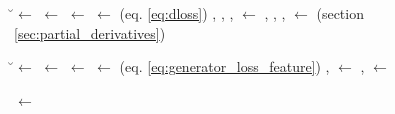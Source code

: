 \begin{algorithm}[H]
{{            \u $\leftarrow$ \Sample{\U} \;
            \fake $\leftarrow$ \Generate{\u} \;
            \real $\leftarrow$ \URMtrain[\u] \;
            \Dloss $\leftarrow$ \Compute{\real, \fake} (eq. \ref{eq:dloss}) \;
            \pBE, \pBD, \pTE, \pTD $\leftarrow$ \Compute{\Dloss, \be, \bd, \thetae, \thetad} \;
            \be, \bd, \thetae, \thetad $\leftarrow$ \Update{\be, \bd, \thetae, \thetad, \pBE, \pBD, \pTE, \pTD, \Dlr} (section \ref{sec:partial_derivatives})\;
            
            \BlankLine\BlankLine
            
            \u $\leftarrow$ \Sample{\U} \;
            \fake $\leftarrow$ \Generate{\u} \;
            \real $\leftarrow$ \URMtrain[\u] \;
            \Gloss $\leftarrow$ \Compute{\real, \fake} (eq. \ref{eq:generator_loss_feature}) \;
            \pWzero, \pWone $\leftarrow$ \Compute{\Gloss, \wzero, \wone} \;
            \wzero, \wone $\leftarrow$ \Update{\wzero, \wone, \pWzero, \pWone, \Glr} \;
        }
    
        \BlankLine\BlankLine
        
        \Perf $\leftarrow$ \Evaluate{\Gen, \URMval} \;
        \If{\Noworse $>$ \AllowedWorse}{\Break}
    }
\end{algorithm}
